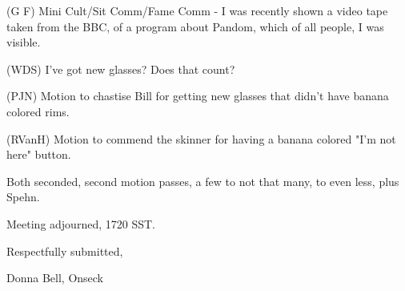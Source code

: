 \documentclass[12pt]{article}
\begin{document}
(G F) Mini Cult/Sit Comm/Fame Comm - I was recently shown a video tape taken from the BBC, of a program about Pandom, which of all people, I was visible.

(WDS) I've got new glasses? Does that count?

(PJN) Motion to chastise Bill for getting new glasses that didn't have banana colored rims.

(RVanH) Motion to commend the skinner for having a banana colored "I'm not here" button.

Both seconded, second motion passes, a few to not that many, to even less, plus Spehn.

\vspace{12pt}

\noindent
Meeting adjourned, 1720 SST.

\vspace{18pt}

\centerline{Respectfully submitted,}
\centerline{Donna Bell, Onseck}
\end{document}
